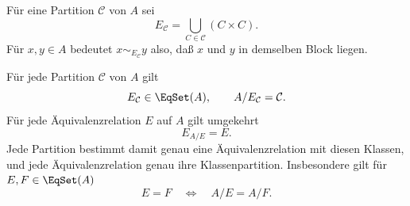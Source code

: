 \begin{definition}
Für eine Partition $\mathcal C$ von $A$ sei
\[
 E_{\mathcal C}=\bigcup_{C\in\mathcal C}(C\times C).
\]
Für $x,y\in A$ bedeutet $x\sim_{E_{\mathcal C}}y$ also,
daß $x$ und $y$ in demselben Block liegen.
\end{definition}

\begin{theorem}
\label{b11guide:thm:partitionconverse}
Für jede Partition $\mathcal C$ von $A$ gilt
\[
 E_{\mathcal C}\in\EqSet(A),\qquad A/E_{\mathcal C}=\mathcal C.
\]
Für jede Äquivalenzrelation $E$ auf $A$ gilt umgekehrt
\[
 E_{A/E}=E.
\]
Jede Partition bestimmt damit genau eine Äquivalenzrelation mit
diesen Klassen, und jede Äquivalenzrelation genau ihre Klassenpartition.
Insbesondere gilt für $E,F\in\EqSet(A)$
\[
 E=F\quad\Longleftrightarrow\quad A/E=A/F.
\]
\end{theorem}

